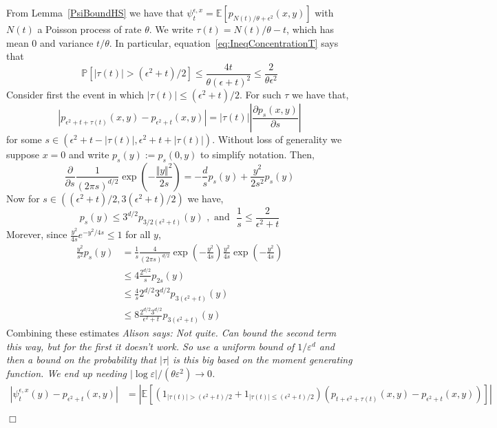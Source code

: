\documentclass[12pt]{article}
\newenvironment {proof}{{\noindent\bf Proof }}{\hfill $\Box$ \medskip}
\newcommand{\IP}{\mathbb P}
\newcommand{\IE}{\mathbb E}
\newcommand{\comment}[1]{{\color{blue} \it #1}}
\begin{document}
\begin{proof}
From Lemma~\ref{PsiBoundHS} we have that $\psi_t^{\epsilon,x} = \IE\left[ p_{N(t)/\theta+\epsilon^2}(x,y) \right]$ with $N(t)$ a Poisson process of rate $\theta$. We write $\tau(t) = N(t)/\theta - t$, which has mean $0$ and variance $t/\theta$. In particular,
equation~\eqref{eq:IneqConcentrationT} says that
\begin{equation}
\IP[|\tau(t)| > (\epsilon^2+t)/2] \leq \frac{4t}{\theta(\epsilon+t)^2} \leq \frac{2}{\theta \epsilon^2} \label{eq:ConcentrationTau}
\end{equation}
Consider first the event in which $|\tau(t)| \leq (\epsilon^2+t)/2$. For such $\tau$ we have that,
\begin{equation} |p_{\epsilon^2+t+\tau(t)}(x,y) - p_{\epsilon^2+t}(x,y) | = |\tau(t)| \left| \frac{\partial p_s(x,y)}{\partial s} \right| \end{equation}
for some $s \in (\epsilon^2+t-|\tau(t)|, \epsilon^2+t+|\tau(t)|)$. Without loss of generality we suppose $x=0$ and write $p_s(y):=p_s(0,y)$ to simplify notation. Then,
\[ \frac{\partial}{\partial s} \frac{1}{(2 \pi s)^{d/2}} \exp(-\frac{\Vert y \Vert^2}{2s}) = - \frac{d}{s} p_s(y) + \frac{y^2}{2 s^2} p_s(y)\]
Now for $s \in ((\epsilon^2+t)/2,3(\epsilon^2+t)/2)$ we have,
\[ p_s(y) \leq 3^{d/2} p_{3/2(\epsilon^2+t)}(y) \, \, ,\text{ and } \, \, \frac{1}{s} \leq \frac{2}{\epsilon^2+t}\]
Morever, since $\frac{y^2}{4s} e^{-y^2/4s} \leq 1$ for all $y$,
\begin{align*}
\frac{y^2}{s^2}  p_s(y) &= \frac{1}{s} \frac{4}{(2 \pi s)^{d/2}}\exp(-\frac{y^2}{4s}) \frac{y^2}{4s} \exp( - \frac{y^2}{4 s}) \\ &\leq  4\frac{ 2^{d/2}}{s} p_{2s}(y) \\ &\leq \frac{4}{s}  2^{d/2} 3^{d/2} p_{3(\epsilon^2+t)}(y)  \\ & \leq 8 \frac{ 2^{d/2} 3^{d/2}}{\epsilon^2+t} p_{3(\epsilon^2+t)}(y)
\end{align*}
Combining these estimates
    \comment{Alison says: Not quite. Can bound the second term this way, but for the first it doesn't work.
    So use a uniform bound of $1/\varepsilon^d$ and then a bound on the probability that $|\tau|$
    is this big based on the moment generating function.
    We end up needing $|\log \varepsilon| / (\theta \varepsilon^2) \to 0$.
    }
\begin{align*}
|\psi_t^{\epsilon,x}(y)-p_{\epsilon^2+t}(x,y)|
    &=
    | \mathbb{E}\left[ (1_{|\tau(t)| > (\epsilon^2+t)/2}+1_{|\tau(t)| \leq (\epsilon^2+t)/2})(p_{t+\epsilon^2+\tau(t)}(x,y)-p_{\epsilon^2+t}(x,y)) \right]| \\

\end{align*}
\end{proof}
\end{document}
